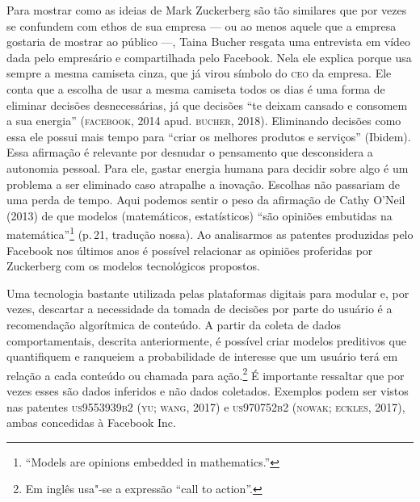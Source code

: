 Para mostrar como as ideias de Mark Zuckerberg são tão similares que por
vezes se confundem com ethos de sua empresa --- ou ao menos aquele que a
empresa gostaria de mostrar ao público ---, Taina Bucher resgata uma
entrevista em vídeo dada pelo empresário e compartilhada pelo Facebook.
Nela ele explica porque usa sempre a mesma camiseta cinza, que já virou
símbolo do \textsc{ceo} da empresa. Ele conta que a escolha de usar a mesma
camiseta todos os dias é uma forma de eliminar decisões desnecessárias,
já que decisões ``te deixam cansado e consomem a sua energia''
(\textsc{facebook}, 2014 apud. \textsc{bucher}, 2018). Eliminando decisões como essa ele
possui mais tempo para ``criar os melhores produtos e serviços''
(Ibidem). Essa afirmação é relevante por desnudar o pensamento que
desconsidera a autonomia pessoal. Para ele, gastar energia humana para
decidir sobre algo é um problema a ser eliminado caso atrapalhe a
inovação. Escolhas não passariam de uma perda de tempo. Aqui podemos
sentir o peso da afirmação de Cathy O'Neil (2013) de que modelos
(matemáticos, estatísticos) ``são opiniões embutidas na
matemática''\footnote{``Models are opinions embedded in mathematics.''}
(p.\,21, tradução nossa). Ao analisarmos as patentes produzidas pelo
Facebook nos últimos anos é possível relacionar as opiniões proferidas
por Zuckerberg com os modelos tecnológicos propostos.

Uma tecnologia bastante utilizada pelas plataformas digitais para
modular e, por vezes, descartar a necessidade da tomada de decisões por
parte do usuário é a recomendação algorítmica de conteúdo. A partir da
coleta de dados comportamentais, descrita anteriormente, é possível
criar modelos preditivos que quantifiquem e ranqueiem a probabilidade de
interesse que um usuário terá em relação a cada conteúdo ou chamada para
ação.\footnote{Em inglês usa"-se a expressão ``call to action''.} É
importante ressaltar que por vezes esses são dados inferidos e não dados
coletados. Exemplos podem ser vistos nas patentes \textsc{us9553939b2} (\textsc{yu; wang},
2017) e \textsc{us970752b2} (\textsc{nowak; eckles}, 2017), ambas concedidas à Facebook
Inc.

